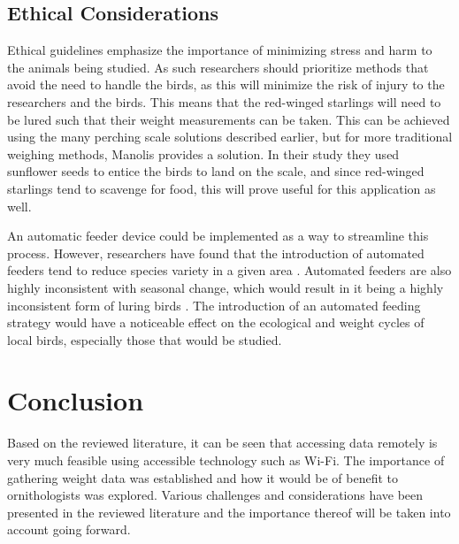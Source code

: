 \documentclass[class=report,11pt,crop=false]{standalone}
\begin{document}
\subsection{Ethical Considerations}
Ethical guidelines emphasize the importance of minimizing stress and harm to the animals being studied. As such researchers should prioritize methods that avoid the need to handle the birds, as this will minimize the risk of injury to the researchers and the birds. This means that the red-winged starlings will need to be lured such that their weight measurements can be taken. This can be achieved using the many perching scale solutions described earlier, but for more traditional weighing methods, Manolis \cite{reid1999measurement} provides a solution. In their study they used sunflower seeds to entice the birds to land on the scale, and since red-winged starlings tend to scavenge for food, this will prove useful for this application as well. 

An automatic feeder device could be implemented as a way to streamline this process. However, researchers have found that the introduction of automated feeders tend to reduce species variety in a given area \cite{GalbraithFeeders}. Automated feeders are also highly inconsistent with seasonal change, which would result in it being a highly inconsistent form of luring birds \cite{GalbraithFeeders}. The introduction of an automated feeding strategy would have a noticeable effect on the ecological and weight cycles of local birds, especially those that would be studied.

\section{Conclusion}

Based on the reviewed literature, it can be seen that accessing data remotely is very much feasible using accessible technology such as Wi-Fi. The importance of gathering weight data was established and how it would be of benefit to ornithologists was explored. Various challenges and considerations have been presented in the reviewed literature and the importance thereof will be taken into account going forward. 

\ifstandalone

\printnoidxglossary[type=\acronymtype,nonumberlist]
\fi
\end{document}
